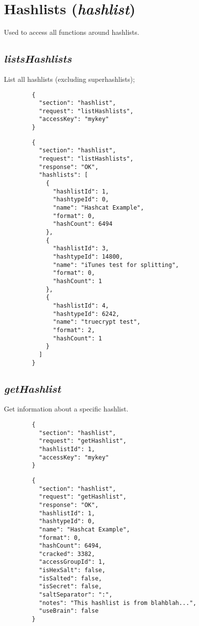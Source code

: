 \section*{Hashlists (\textit{hashlist})}
	Used to access all functions around hashlists.

\subsection*{\textit{listsHashlists}}
	List all hashlists (excluding superhashlists);
	{
		\color{blue}
		\begin{verbatim}
		{
		  "section": "hashlist",
		  "request": "listHashlists",
		  "accessKey": "mykey"
		}
		\end{verbatim}
	}
	{
		\color{OliveGreen}
		\begin{verbatim}
		{
		  "section": "hashlist",
		  "request": "listHashlists",
		  "response": "OK",
		  "hashlists": [
		    {
		      "hashlistId": 1,
		      "hashtypeId": 0,
		      "name": "Hashcat Example",
		      "format": 0,
		      "hashCount": 6494
		    },
		    {
		      "hashlistId": 3,
		      "hashtypeId": 14800,
		      "name": "iTunes test for splitting",
		      "format": 0,
		      "hashCount": 1
		    },
		    {
		      "hashlistId": 4,
		      "hashtypeId": 6242,
		      "name": "truecrypt test",
		      "format": 2,
		      "hashCount": 1
		    }
		  ]
		}
		\end{verbatim}
	}
\subsection*{\textit{getHashlist}}
	Get information about a specific hashlist.
	{
		\color{blue}
		\begin{verbatim}
		{
		  "section": "hashlist",
		  "request": "getHashlist",
		  "hashlistId": 1,
		  "accessKey": "mykey"
		}
		\end{verbatim}
	}
	{
		\color{OliveGreen}
		\begin{verbatim}
		{
		  "section": "hashlist",
		  "request": "getHashlist",
		  "response": "OK",
		  "hashlistId": 1,
		  "hashtypeId": 0,
		  "name": "Hashcat Example",
		  "format": 0,
		  "hashCount": 6494,
		  "cracked": 3382,
		  "accessGroupId": 1,
		  "isHexSalt": false,
		  "isSalted": false,
		  "isSecret": false,
		  "saltSeparator": ":",
		  "notes": "This hashlist is from blahblah...",
		  "useBrain": false
		}
		\end{verbatim}
	}
